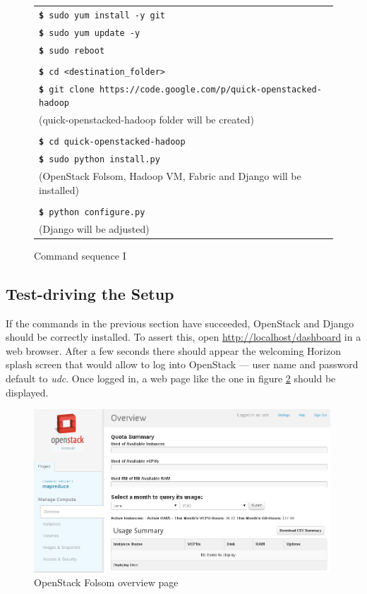 \begin{figure}[tbp]
 \begin{center}
  \begin{tabular}{|l|}
   \hline
   \texttt{{\bf \$} sudo yum install -y git} \\
   \texttt{{\bf \$} sudo yum update -y} \\
   \texttt{{\bf \$} sudo reboot} \\ \\
   \texttt{{\bf \$} cd <destination\_folder>} \\
   \texttt{{\bf \$} git clone https://code.google.com/p/quick-openstacked-hadoop} \\
   (quick-openstacked-hadoop folder will be created) \\ \\
   \texttt{{\bf \$} cd quick-openstacked-hadoop} \\
   \texttt{{\bf \$} sudo python install.py} \\
   (OpenStack Folsom, Hadoop VM, Fabric and Django will be installed) \\ \\
   \texttt{{\bf \$} python configure.py} \\
   (Django will be adjusted) \\
   \hline
  \end{tabular}
  \caption{Command sequence I}
  \label{fig:comandosshell}
 \end{center}
\end{figure}

\subsection{Test-driving the Setup}\label{subsec:testejecucion}
\noindent If the commands in the previous section have succeeded, OpenStack and Django should be correctly installed. To assert this, open \url{http://localhost/dashboard} in a web browser. After a few seconds there should appear the welcoming Horizon splash screen that would allow to log into OpenStack --- user name and password default to \emph{udc}. Once logged in, a web page like the one in figure \ref{fig:homeos} should be displayed.

\begin{figure}[tbp]
\begin{center}
\includegraphics[width=0.99\textwidth]{imagenes/045.png}
\caption{OpenStack Folsom overview page}
\label{fig:homeos}
\end{center}
\end{figure}

